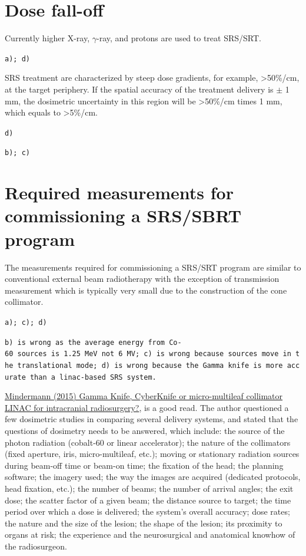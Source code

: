 \documentclass[]{book}
\theoremstyle{definition}
\theoremstyle{definition}
\theoremstyle{definition}
\theoremstyle{remark}
\begin{document}
\section{Dose fall-off}\label{dose-fall-off}

Currently higher X-ray, \(\gamma\)-ray, and protons are used to treat
SRS/SRT.

\texttt{a);\ d)}

SRS treatment are characterized by steep dose gradients, for example,
\textgreater{}50\%/cm, at the target periphery. If the spatial accuracy
of the treatment delivery is \(\pm\) 1 mm, the dosimetric uncertainty in
this region will be \textgreater{}50\%/cm times 1 mm, which equals to
\textgreater{}5\%/cm.

\texttt{d)}

\texttt{b);\ c)}

\section{Required measurements for commissioning a SRS/SBRT
program}\label{required-measurements-for-commissioning-a-srssbrt-program}

The measurements required for commissioning a SRS/SRT program are
similar to conventional external beam radiotherapy with the exception of
transmission measurement which is typically very small due to the
construction of the cone collimator.

\texttt{a);\ c);\ d)}

\texttt{b)\ is\ wrong\ as\ the\ average\ energy\ from\ Co-60\ sources\ is\ 1.25\ MeV\ not\ 6\ MV;\ c)\ is\ wrong\ because\ sources\ move\ in\ the\ translational\ mode;\ d)\ is\ wrong\ because\ the\ Gamma\ knife\ is\ more\ accurate\ than\ a\ linac-based\ SRS\ system.}

\href{https://link.springer.com/article/10.1007/s00701-014-2275-6}{Mindermann
(2015) Gamma Knife, CyberKnife or micro-multileaf collimator LINAC for
intracranial radiosurgery?}, is a good read. The author questioned a few
dosimetric studies in comparing several delivery systems, and stated
that the questions of dosimetry needs to be answered, which include: the
source of the photon radiation (cobalt-60 or linear accelerator); the
nature of the collimators (fixed aperture, iris, micro-multileaf, etc.);
moving or stationary radiation sources during beam-off time or beam-on
time; the fixation of the head; the planning software; the imagery used;
the way the images are acquired (dedicated protocols, head fixation,
etc.); the number of beams; the number of arrival angles; the exit dose;
the scatter factor of a given beam; the distance source to target; the
time period over which a dose is delivered; the system's overall
accuracy; dose rates; the nature and the size of the lesion; the shape
of the lesion; its proximity to organs at risk; the experience and the
neurosurgical and anatomical knowhow of the radiosurgeon.
\end{document}
